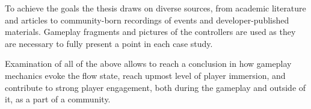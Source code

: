 To achieve the goals the thesis draws on diverse sources, from academic literature and articles to community-born recordings of events and developer-published materials. Gameplay fragments and pictures of the controllers are used as they are necessary to fully present a point in each case study. 

Examination of all of the above allows to reach a conclusion in how gameplay mechanics evoke the flow state, reach upmost level of player immersion, and contribute to strong player engagement, both during the gameplay and outside of it, as a part of a community.